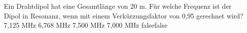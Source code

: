     {Ein Drahtdipol hat eine Gesamtlänge von 20 m. Für welche Frequenz ist der Dipol in Resonanz, wenn mit einem Verkürzungsfaktor von 0,95 gerechnet wird?}
    {7,125 MHz}
    {6,768 MHz}
    {7,500 MHz}
    {7,000 MHz}
    {false}{false}